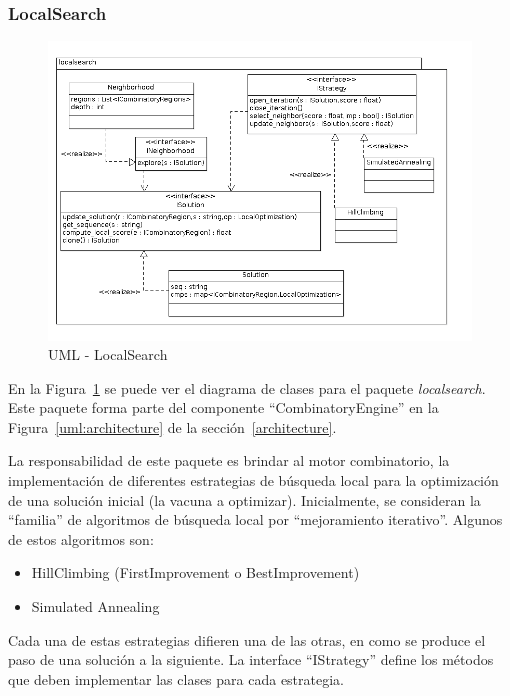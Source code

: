   \subsubsection{LocalSearch}
  \begin{figure}
      \centering
      \includegraphics[scale=0.5]{lld-localsearch.png}  
      \caption{UML - LocalSearch}
      \label{uml:lld-localsearch}
    \end{figure}
En la Figura~\ref{uml:lld-localsearch} se puede ver el diagrama de clases
para el paquete \textit{localsearch}. Este paquete forma parte del componente
``CombinatoryEngine'' en la Figura~\ref{uml:architecture} de la
secci\'on~\ref{architecture}.

  La responsabilidad de este paquete es brindar al motor combinatorio, la
implementaci\'on de diferentes estrategias de b\'usqueda local para la
optimizaci\'on de una soluci\'on inicial (la vacuna a optimizar). Inicialmente,
se consideran la ``familia'' de algoritmos de b\'usqueda local por
``mejoramiento iterativo''. Algunos de estos algoritmos son:
\begin{itemize}
 \item HillClimbing (FirstImprovement o BestImprovement)
 \item Simulated Annealing
\end{itemize}

  Cada una de estas estrategias difieren una de las otras, en como se produce
el paso de una soluci\'on a la siguiente. La interface ``IStrategy'' define los
m\'etodos que deben implementar las clases para cada estrategia.

